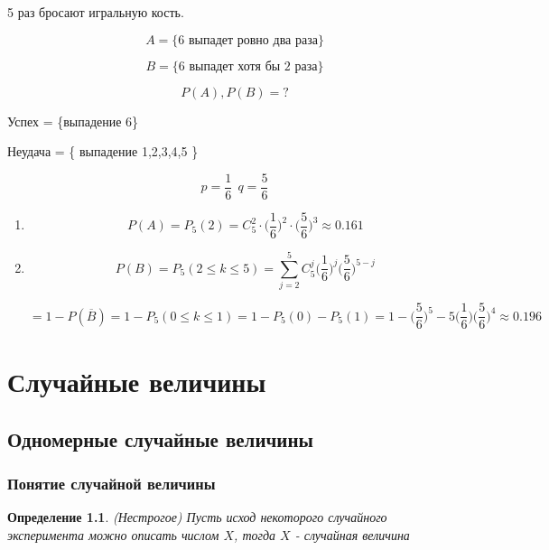 \documentclass[a4paper, 14pt]{report}
\newtheorem{defenition}{Определение}[section]
\begin{document}
5 раз бросают игральную кость.

$$
A = \{ \text{6 выпадет ровно два раза} \}
$$

$$
B = \{ \text{6 выпадет хотя бы 2 раза} \}
$$

$$
P(A),P(B) = ?
$$

Успех = \{выпадение 6\}

Неудача = \{ выпадение 1,2,3,4,5 \}

$$
p = \frac{1}{6}\ \ q = \frac{5}{6}
$$

\begin{enumerate}
    \item
        $$
        P(A) = P_5(2) = C_5^2 \cdot \bigg(\frac{1}{6}\bigg)^2 \cdot \bigg(\frac{5}{6}\bigg)^3 \approx 0.161
        $$

    \item

        $$
        P(B) = P_5(2 \le k \le 5) = \sum_{j=2}^5 C_5^j \bigg(\frac{1}{6}\bigg)^j \bigg(\frac{5}{6}\bigg)^{5-j}
        $$

        $$
        = 1 - P(\overline B) = 1 - P_5(0 \le k \le 1) = 1 - P_5(0) - P_5(1) = 1 - \bigg(\frac{5}{6}\bigg)^5 - 5 \bigg(\frac{1}{6} \bigg) \bigg(\frac{5}{6}\bigg)^4 \approx 0.196
        $$
\end{enumerate}

\chapter{Случайные величины}

\section{Одномерные случайные величины}

\subsection{Понятие случайной величины}

\begin{defenition}
    (Нестрогое) Пусть исход некоторого случайного эксперимента можно описать числом $X$, тогда $X$ - случайная величина
\end{defenition}
\end{document}
